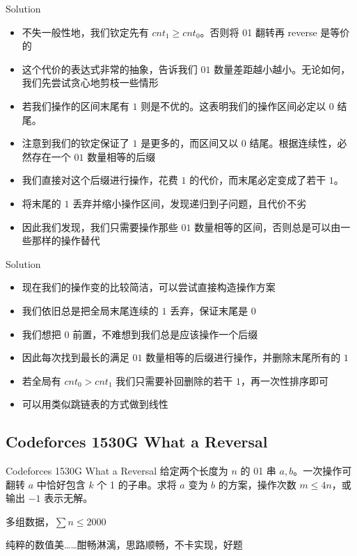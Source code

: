 ﻿\documentclass[aspectratio=169]{ctexbeamer}
\begin{document}
\begin{frame}{Solution}
    \begin{itemize}
        \item 不失一般性地，我们钦定先有 $cnt_1\ge cnt_0$。否则将 01 翻转再 reverse 是等价的
        \item 这个代价的表达式非常的抽象，告诉我们 $01$ 数量差距越小越小。无论如何，我们先尝试贪心地剪枝一些情形
        \item 若我们操作的区间末尾有 $ 1 $ 则是不优的。这表明我们的操作区间必定以 $ 0 $ 结尾。
        \item 注意到我们的钦定保证了 $ 1 $ 是更多的，而区间又以 $ 0 $ 结尾。根据连续性，必然存在一个 $01$ 数量相等的后缀
        \item 我们直接对这个后缀进行操作，花费 $1$ 的代价，而末尾必定变成了若干 $ 1 $。
        \item 将末尾的 $ 1 $ 丢弃并缩小操作区间，发现递归到子问题，且代价不劣
        \item 因此我们发现，我们只需要操作那些 $01$ 数量相等的区间，否则总是可以由一些那样的操作替代
    \end{itemize}
\end{frame}

\begin{frame}{Solution}
    \begin{itemize}
        \item 现在我们的操作变的比较简洁，可以尝试直接构造操作方案
        \item 我们依旧总是把全局末尾连续的 $ 1 $ 丢弃，保证末尾是 $ 0 $
        \item 我们想把 $ 0 $ 前置，不难想到我们总是应该操作一个后缀
        \item 因此每次找到最长的满足 $01$ 数量相等的后缀进行操作，并删除末尾所有的 $ 1 $
        \item 若全局有 $cnt_0> cnt_1$ 我们只需要补回删除的若干 $ 1 $，再一次性排序即可
        \item 可以用类似跳链表的方式做到线性
    \end{itemize}
\end{frame}

\subsection{Codeforces 1530G What a Reversal}
\begin{frame}{Codeforces 1530G What a Reversal}
    给定两个长度为 $n$ 的 01 串 $a,b$。一次操作可翻转 $a$ 中恰好包含 $k$ 个 1 的子串。求将 $a$ 变为 $b$ 的方案，操作次数 $m\le 4n$，或输出 $-1$ 表示无解。
    
    多组数据，$\sum n\le 2000$

    纯粹的数值美……酣畅淋漓，思路顺畅，不卡实现，好题
\end{frame}
\end{document}
